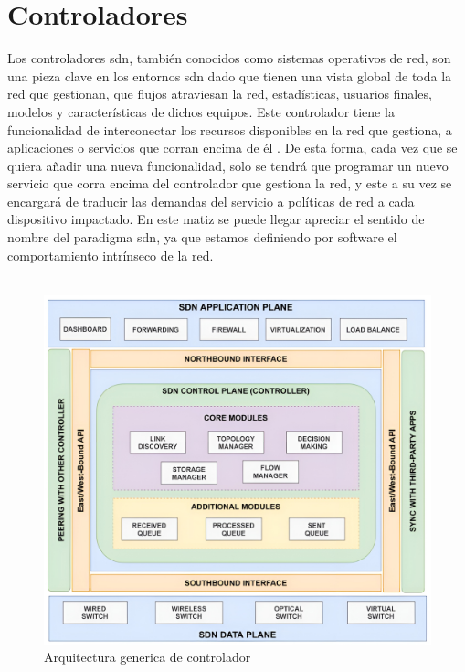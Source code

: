 \section{Controladores }
\label{sec:sdnControllers}

Los controladores \gls{sdn}, también conocidos como sistemas operativos de red, son una pieza clave en los entornos  \gls{sdn} dado que tienen una vista global de toda la red que gestionan, que flujos atraviesan la red, estadísticas, usuarios finales, modelos y características de dichos equipos. Este controlador tiene la funcionalidad de interconectar los recursos disponibles en la red que gestiona, a aplicaciones o servicios que corran encima de él \cite{nadeau2013sdn}. De esta forma, cada vez que se quiera añadir una nueva funcionalidad, solo se tendrá que programar un nuevo servicio que corra encima del controlador que gestiona la red, y este a su vez se encargará de traducir las demandas del servicio a políticas de red a cada dispositivo impactado. En este matiz se puede llegar apreciar el sentido de nombre del paradigma \gls{sdn}, ya que estamos definiendo por software el comportamiento intrínseco de la red.\\
\\
\begin{figure}[ht]
    \centering
    \includegraphics[width=\textwidth]{archivos/img/teoria/sdn_controllers.jpg}
    \caption{Arquitectura generica de controlador  \cite{zhu2020sdn}}
    \label{fig:sdn_controllers}
\end{figure}


